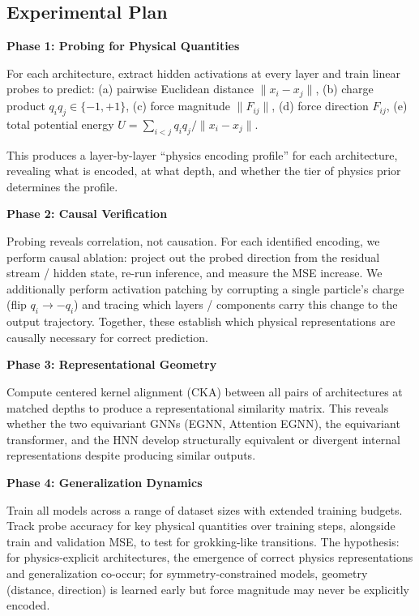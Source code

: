 \documentclass[12pt]{article}
\begin{document}
\subsection{Experimental Plan}

\textbf{Phase 1: Probing for Physical Quantities}

For each architecture, extract hidden activations at every layer and train
linear probes to predict: (a) pairwise Euclidean distance $\|x_i - x_j\|$, (b)
charge product $q_i q_j \in \{-1, +1\}$, (c) force magnitude $\|F_{ij}\|$, (d)
force direction $\hat{F}_{ij}$, (e) total potential energy $U = \sum_{i<j} q_i
q_j / \|x_i - x_j\|$.

This produces a layer-by-layer ``physics encoding profile'' for each
architecture, revealing what is encoded, at what depth, and whether the tier of
physics prior determines the profile.

\textbf{Phase 2: Causal Verification}

Probing reveals correlation, not causation. For each identified encoding, we
perform causal ablation: project out the probed direction from the residual
stream / hidden state, re-run inference, and measure the MSE increase. We
additionally perform activation patching by corrupting a single particle's
charge (flip $q_i \to -q_i$) and tracing which layers / components carry this
change to the output trajectory. Together, these establish which physical
representations are causally necessary for correct prediction.

\textbf{Phase 3: Representational Geometry}

Compute centered kernel alignment (CKA) between all pairs of architectures at
matched depths to produce a representational similarity matrix. This reveals
whether the two equivariant GNNs (EGNN, Attention EGNN), the equivariant
transformer, and the HNN develop structurally equivalent or divergent internal
representations despite producing similar outputs.

\textbf{Phase 4: Generalization Dynamics}

Train all models across a range of dataset sizes with extended training budgets.
Track probe accuracy for key physical quantities over training steps, alongside
train and validation MSE, to test for grokking-like transitions. The hypothesis:
for physics-explicit architectures, the emergence of correct physics
representations and generalization co-occur; for symmetry-constrained models,
geometry (distance, direction) is learned early but force magnitude may never be
explicitly encoded.
\end{document}

